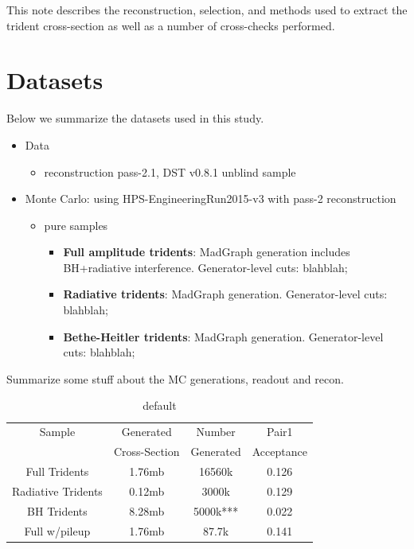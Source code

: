 \documentclass[twoside]{article}
\begin{document}
This note describes the reconstruction, selection, and methods used to extract the trident cross-section as well as a number of cross-checks performed.  





\section{Datasets}

Below we summarize the datasets used in this study.  


\begin{itemize}
\item Data
\begin{itemize}
\item reconstruction pass-2.1, DST v0.8.1 unblind sample
\end{itemize}
\item Monte Carlo:  using HPS-EngineeringRun2015-v3 with pass-2 reconstruction
\begin{itemize}
\item pure samples
\begin{itemize}
\item \textbf{Full amplitude tridents}:  MadGraph generation includes BH+radiative interference.  Generator-level cuts:  blahblah; 
\item \textbf{Radiative tridents}:  MadGraph generation.  Generator-level cuts:  blahblah;
\item \textbf{Bethe-Heitler tridents}:  MadGraph generation.  Generator-level cuts:  blahblah;
\end{itemize}
\end{itemize}
\end{itemize}

Summarize some stuff about the MC generations, readout and recon. 

\begin{table}[htdp]
\caption{default}
\begin{center}
\begin{tabular}{c|c|c|c}
\hline
Sample    			&Generated       & Number     & Pair1\\
				& Cross-Section& Generated & Acceptance\\
\hline
Full Tridents		&  1.76mb		 &  16560k      & 0.126  \\
Radiative Tridents 	&  	0.12mb	 &  3000k	      &  0.129 \\
BH Tridents		&  8.28mb		&  5000k***	& 0.022\\
\hline
Full w/pileup		&   1.76mb	& 87.7k		& 0.141\\
\hline
\end{tabular}
\end{center}
\label{tab:mc}
\end{table}%
\end{document}
